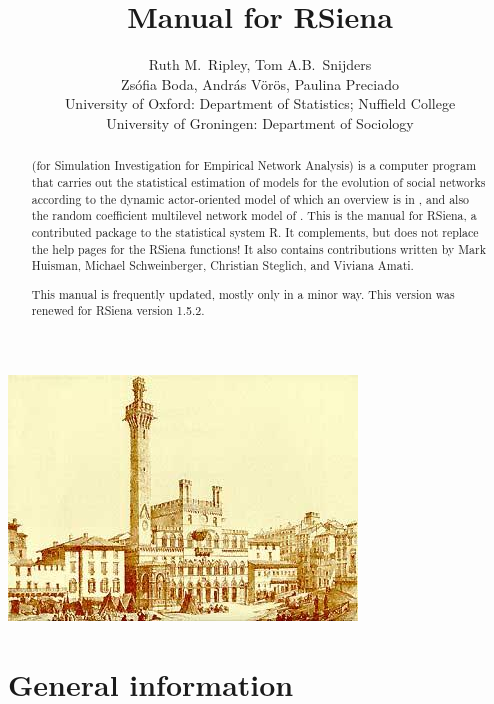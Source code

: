 \documentclass[a4paper,fleqn,11pt]{article}
\title{{\Huge Manual for \textsf{RSiena} } }
\author{\Large Ruth M.\ Ripley, Tom A.B.\ Snijders\\[1ex]
        \Large Zs\'{o}fia Boda, Andr\'{a}s V\"{o}r\"{o}s, Paulina Preciado  \\[4ex]
       {\large University of Oxford: Department of Statistics; Nuffield College}\\[1ex]
       {\large University of Groningen: Department of Sociology}\\[1ex]
    }
\newcommand{\+}{\, + \,}
\newcommand{\Rn}{{\sf R}}
\newcommand{\rs}{{\sf RSiena}}
\newcommand{\RS}{{\sf \textsf{RSiena} }}
\newcommand{\SI}{{\sf SIENA }}
\begin{document}

\maketitle

\vfill
\begin{center}
\includegraphics*[scale=3]{ilcampo.jpg}
\end{center}
\vfill

\begin{abstract}
\noindent \SI (for {\sf Simulation Investigation for Empirical
Network Analysis}) is a computer program that carries out the
statistical estimation of models for the evolution of social
networks according to the dynamic actor-oriented model of
which an overview is in \citet{Snijders2017},
and also the random coefficient multilevel network model of
\citet{KoskinenSnijders2023}.
This is the manual for \rs,
a contributed package to the statistical system \Rn.
It complements, but does not replace the help pages
for the \RS functions!
It also contains contributions written
by Mark Huisman, Michael Schweinberger, Christian Steglich,
and Viviana Amati.

This manual is frequently updated, mostly only in a minor way.
This version was renewed for \RS version 1.5.2.
\end{abstract}




\vfill
\newpage
\tableofcontents
\newpage

\makeatletter
\def\@linkcolor{lc}
\makeatother


\section{General information}
\end{document}
